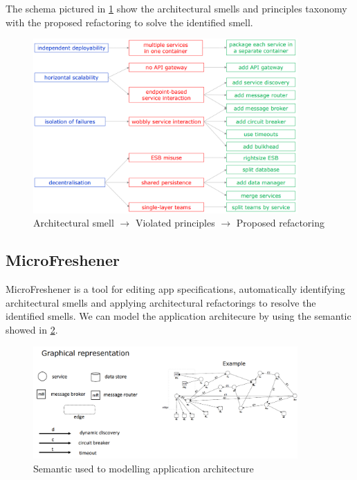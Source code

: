 \documentclass[10pt,a4paper]{report}
\begin{document}
The schema pictured in \ref{image70} show the architectural smells and principles taxonomy with the proposed refactoring to solve the identified smell.
\begin{figure}[h]
	\centering
	\includegraphics[width=0.9\textwidth]{image70}
	\caption{Architectural smell $\rightarrow$ Violated principles $\rightarrow$ Proposed refactoring}
	\label{image70}
\end{figure} 


\subsection{MicroFreshener}
MicroFreshener is a tool for editing app specifications, automatically identifying architectural smells and applying architectural refactorings to resolve the identified smells.
We can model the application architecure by using the semantic showed in \ref{image71}.
\begin{figure}[h]
	\centering
	\includegraphics[width=0.9\textwidth]{image71}
	\caption{Semantic used to modelling application architecture }
	\label{image71}
\end{figure} 
\end{document}
